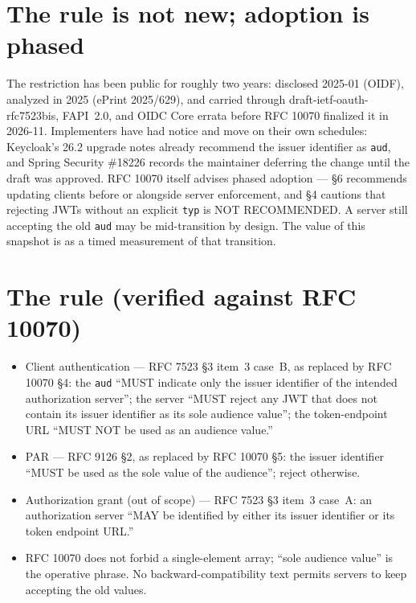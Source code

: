 \documentclass[10pt,twocolumn]{article}
\newcommand{\code}[1]{\texttt{\small #1}}
\begin{document}
\section{The rule is not new; adoption is phased}
The restriction has been public for roughly two years: disclosed 2025-01 (OIDF),
analyzed in 2025 (ePrint 2025/629), and carried through
\mbox{draft-ietf-oauth-rfc7523bis}, FAPI~2.0, and OIDC Core errata before RFC 10070
finalized it in 2026-11. Implementers have had notice and move on their own
schedules: Keycloak's 26.2 upgrade notes already recommend the issuer identifier as
\code{aud}, and Spring Security \#18226 records the maintainer deferring the change
until the draft was approved. RFC 10070 itself advises phased adoption --- \S6
recommends updating clients before or alongside server enforcement, and \S4 cautions
that rejecting JWTs without an explicit \code{typ} is NOT RECOMMENDED. A server
still accepting the old \code{aud} may be mid-transition by design. The value of
this snapshot is as a timed measurement of that transition.

\section{The rule (verified against RFC 10070)}
\begin{itemize}
\item Client authentication --- RFC 7523 \S3 item~3 case~B, as replaced by RFC 10070
  \S4: the \code{aud} ``MUST indicate only the issuer identifier of the intended
  authorization server''; the server ``MUST reject any JWT that does not contain its
  issuer identifier as its sole audience value''; the token-endpoint URL ``MUST NOT
  be used as an audience value.''
\item PAR --- RFC 9126 \S2, as replaced by RFC 10070 \S5: the issuer identifier
  ``MUST be used as the sole value of the audience''; reject otherwise.
\item Authorization grant (out of scope) --- RFC 7523 \S3 item~3 case~A: an
  authorization server ``MAY be identified by either its issuer identifier or its
  token endpoint URL.''
\item RFC 10070 does not forbid a single-element array; ``sole audience value'' is
  the operative phrase. No backward-compatibility text permits servers to keep
  accepting the old values.
\end{itemize}
\end{document}
